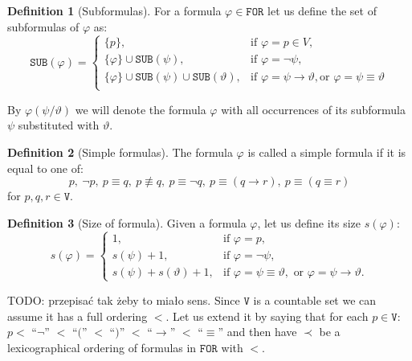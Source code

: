 \documentclass{article}
\theoremstyle{definition}
\newtheorem{definition}{Definition}[section]
\newcommand*{\id}{\equiv}
\newcommand*{\ra}{\rightarrow}
\newcommand*{\V}{\texttt{V}}
\newcommand*{\FOR}{\texttt{FOR}}
\newcommand*{\SUB}{\texttt{SUB}}
\begin{document}
\begin{definition}[Subformulas]
    For a formula $\varphi \in \FOR$ let us define the set of subformulas of $\varphi$ as:
    $$
        \SUB(\varphi) = \begin{cases}
            \{p\},                                            & \text{if } \varphi = p \in V,                                                    \\
            \{\varphi\} \cup \SUB(\psi),                      & \text{if } \varphi = \lnot \psi,                                                 \\
            \{\varphi\} \cup \SUB(\psi) \cup \SUB(\vartheta), & \text{if } \varphi = \psi \ra \vartheta, \text{or } \varphi = \psi \id \vartheta \\
        \end{cases}
    $$
\end{definition}

By $\varphi(\psi / \vartheta)$ we will denote the formula $\varphi$ with all occurrences of its subformula $\psi$ substituted with $\vartheta$.

\begin{definition}[Simple formulas]
    The formula $\varphi$ is called a simple formula if it is equal to one of:
    $$
        p,\ \lnot p,\ p \id q,\ p \not \id q,\ p \id \lnot q,\ p \id (q \ra r),\ p \id (q \id r)
    $$
    for $p, q, r \in \V$.
\end{definition}

\begin{definition}[Size of formula]
    Given a formula $\varphi$, let us define its size $s(\varphi)$:
    $$
        s(\varphi) = \begin{cases}
            1,                          & \text{if } \varphi = p,                                                                      \\
            s(\psi) + 1,                & \text{if } \varphi = \lnot \psi,                                                             \\
            s(\psi) + s(\vartheta) + 1, & \text{if } \varphi = \psi \equiv \vartheta,\text{ or } \varphi = \psi \rightarrow \vartheta.
        \end{cases}
    $$
\end{definition}

TODO: przepisać tak żeby to miało sens.
Since $\V$ is a countable set we can assume it has a full ordering $<$. Let us extend it by saying that for each $p \in \V$: $p < $ \enquote{$\lnot$} $<$ \enquote{$($} $<$ \enquote{$)$} $<$ \enquote{$\ra$} $<$ \enquote{$\id$} and then have $\prec$ be a lexicographical ordering of formulas in $\FOR$ with $<$.
\end{document}
